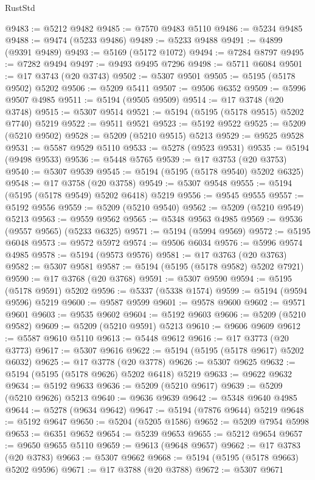 \begin{lexlean}{RustStd}
\begin{coremodule}
@9483 := @5212 @9482
@9485 := @7570 @9483 @5110
@9486 := @5234 @9485
@9488 := @9474 (@5233 @9486)
@9489 := @5233 @9488
@9491 := @4899 (@9391 @9489)
@9493 := @5169 (@5172 @1072)
@9494 := @7284 @8797
@9495 := @7282 @9494
@9497 := @9493 @9495 @7296
@9498 := @5711 @6084
@9501 := @17 @3743 (@20 @3743)
@9502 := @5307 @9501
@9505 := @5195 (@5178 @9502) @5202
@9506 := @5209 @5411
@9507 := @9506 @6352
@9509 := @5996 @9507 @4985
@9511 := @5194 (@9505 @9509)
@9514 := @17 @3748 (@20 @3748)
@9515 := @5307 @9514
@9521 := @5194 (@5195 (@5178 @9515) @5202 @7740) @5219
@9522 := @9511 @9521
@9523 := @5192 @9522
@9525 := @5209 (@5210 @9502)
@9528 := @5209 (@5210 @9515) @5213
@9529 := @9525 @9528
@9531 := @5587 @9529 @5110
@9533 := @5278 (@9523 @9531)
@9535 := @5194 (@9498 @9533)
@9536 := @5448 @5765
@9539 := @17 @3753 (@20 @3753)
@9540 := @5307 @9539
@9545 := @5194 (@5195 (@5178 @9540) @5202 @6325)
@9548 := @17 @3758 (@20 @3758)
@9549 := @5307 @9548
@9555 := @5194 (@5195 (@5178 @9549) @5202 @6418) @5219
@9556 := @9545 @9555
@9557 := @5192 @9556
@9559 := @5209 (@5210 @9540)
@9562 := @5209 (@5210 @9549) @5213
@9563 := @9559 @9562
@9565 := @5348 @9563 @4985
@9569 := @9536 (@9557 @9565) (@5233 @6325)
@9571 := @5194 (@5994 @9569)
@9572 := @5195 @6048
@9573 := @9572 @5972
@9574 := @9506 @6034
@9576 := @5996 @9574 @4985
@9578 := @5194 (@9573 @9576)
@9581 := @17 @3763 (@20 @3763)
@9582 := @5307 @9581
@9587 := @5194 (@5195 (@5178 @9582) @5202 @7921)
@9590 := @17 @3768 (@20 @3768)
@9591 := @5307 @9590
@9594 := @5195 (@5178 @9591) @5202
@9596 := @5337 (@5338 @1574)
@9599 := @5194 (@9594 @9596) @5219
@9600 := @9587 @9599
@9601 := @9578 @9600
@9602 := @9571 @9601
@9603 := @9535 @9602
@9604 := @5192 @9603
@9606 := @5209 (@5210 @9582)
@9609 := @5209 (@5210 @9591) @5213
@9610 := @9606 @9609
@9612 := @5587 @9610 @5110
@9613 := @5448 @9612
@9616 := @17 @3773 (@20 @3773)
@9617 := @5307 @9616
@9622 := @5194 (@5195 (@5178 @9617) @5202 @6032)
@9625 := @17 @3778 (@20 @3778)
@9626 := @5307 @9625
@9632 := @5194 (@5195 (@5178 @9626) @5202 @6418) @5219
@9633 := @9622 @9632
@9634 := @5192 @9633
@9636 := @5209 (@5210 @9617)
@9639 := @5209 (@5210 @9626) @5213
@9640 := @9636 @9639
@9642 := @5348 @9640 @4985
@9644 := @5278 (@9634 @9642)
@9647 := @5194 (@7876 @9644) @5219
@9648 := @5192 @9647
@9650 := @5204 (@5205 @1586)
@9652 := @5209 @7954 @5998
@9653 := @6351 @9652
@9654 := @5239 @9653
@9655 := @5212 @9654
@9657 := @9650 @9655 @5110
@9659 := @9613 (@9648 @9657)
@9662 := @17 @3783 (@20 @3783)
@9663 := @5307 @9662
@9668 := @5194 (@5195 (@5178 @9663) @5202 @9596)
@9671 := @17 @3788 (@20 @3788)
@9672 := @5307 @9671

\end{coremodule}
\end{lexlean}
